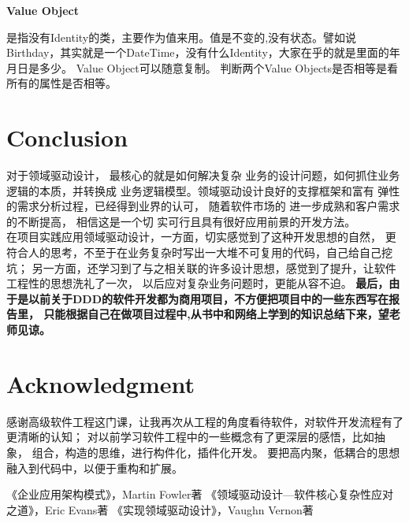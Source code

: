 \documentclass[journal]{IEEEtran}
\begin{document}
\begin{CJK*}{UTF8}{gbsn}
\indent 
{\bfseries Value Object} 
 
是指没有Identity的类，主要作为值来用。值是不变的,没有状态。譬如说Birthday，其实就是一个DateTime，没有什么Identity，大家在乎的就是里面的年月日是多少。
Value Object可以随意复制。
判断两个Value Objects是否相等是看所有的属性是否相等。

 




 \section{Conclusion}
对于领域驱动设计， 最核心的就是如何解决复杂
业务的设计问题，如何抓住业务逻辑的本质，并转换成
业务逻辑模型。领域驱动设计良好的支撑框架和富有
弹性的需求分析过程，已经得到业界的认可，  随着软件市场的
进一步成熟和客户需求的不断提高， 相信这是一个切
实可行且具有很好应用前景的开发方法。
\\
\indent
在项目实践应用领域驱动设计，一方面，切实感觉到了这种开发思想的自然，
更符合人的思考，不至于在业务复杂时写出一大堆不可复用的代码，自己给自己挖坑；
另一方面，还学习到了与之相关联的许多设计思想，感觉到了提升，让软件工程性的思想洗礼了一次，
以后应对复杂业务问题时，更能从容不迫。
{\bfseries  最后，由于是以前关于DDD的软件开发都为商用项目，不方便把项目中的一些东西写在报告里，
只能根据自己在做项目过程中,从书中和网络上学到的知识总结下来，望老师见谅。}


 
 


\section*{Acknowledgment}
感谢高级软件工程这门课，让我再次从工程的角度看待软件，对软件开发流程有了更清晰的认知；
对以前学习软件工程中的一些概念有了更深层的感悟，比如抽象，
组合，构造的思维，进行构件化，插件化开发。
要把高内聚，低耦合的思想融入到代码中，以便于重构和扩展。


\ifCLASSOPTIONcaptionsoff
  \newpage
\fi



\begin{thebibliography}{1}
 
 
  《企业应用架构模式》，Martin Fowler著
  《领域驱动设计—软件核心复杂性应对之道》，Eric Evans著 
  《实现领域驱动设计》，Vaughn Vernon著
  
\end{thebibliography}

 
\clearpage
\end{CJK*}
\end{document}
